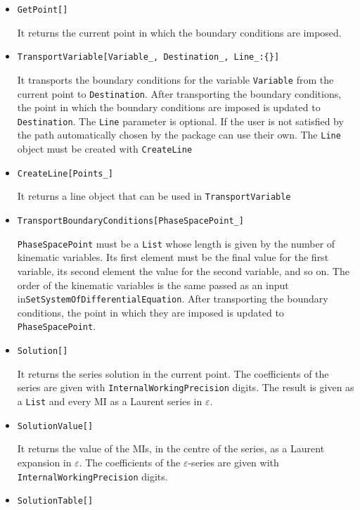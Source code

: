 \documentclass[final,1p,times]{elsarticle}
\begin{document}
\begin{itemize}
    \item \texttt{GetPoint[]}
    
    It returns the current point in which the boundary conditions are imposed.
    
    \item \texttt{TransportVariable[Variable\_, Destination\_, Line\_:\{\}]}
    
    It transports the boundary conditions for the variable \texttt{Variable} from the current point to \texttt{Destination}. After transporting the boundary conditions, the point in which the boundary conditions are imposed is updated to \texttt{Destination}. The \texttt{Line} parameter is optional. If the user is not satisfied by the path automatically chosen by the package can use their own. The \texttt{Line} object must be created with \texttt{CreateLine}
    
    \item \texttt{CreateLine[Points\_]}
    
    It returns a line object that can be used in \texttt{TransportVariable}
    
    \item \texttt{TransportBoundaryConditions[PhaseSpacePoint\_]}
    
    \texttt{PhaseSpacePoint} must be a \texttt{List} whose length is given by the number of kinematic variables. Its first element must be the final value for the first variable, its second element the value for the second variable, and so on. The order of the kinematic variables is the same passed as an input in\texttt{SetSystemOfDifferentialEquation}. After transporting the boundary conditions, the point in which they are imposed is updated to \texttt{PhaseSpacePoint}.
    
    \item \texttt{Solution[]}
    
    It returns the series solution in the current point. The coefficients of the series are given with \texttt{InternalWorkingPrecision} digits. The result is given as a \texttt{List} and every MI as a Laurent series in $\varepsilon$.
    
    \item \texttt{SolutionValue[]}
    
    It returns the value of the MIs, in the centre of the series, as a Laurent expansion in $\varepsilon$. The coefficients of the $\varepsilon$-series are given with \texttt{InternalWorkingPrecision} digits.
    
    \item \texttt{SolutionTable[]}
    

\end{itemize}
\end{document}
